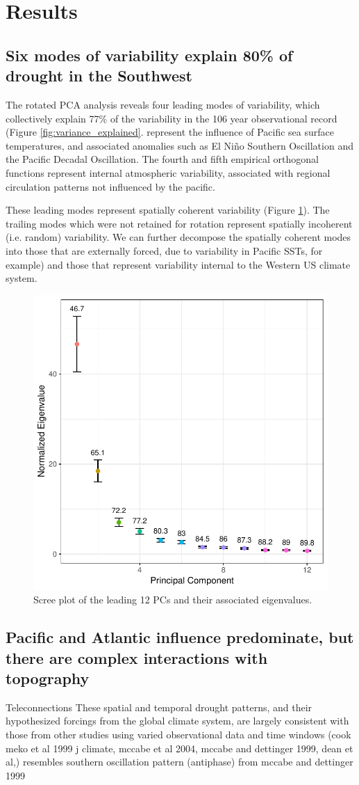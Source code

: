 \documentclass[fleqn,10pt]{wlscirep}
\begin{document}
\section*{Results}

\subsection*{Six modes of variability explain 80\% of drought in the Southwest}

The rotated PCA analysis reveals four leading modes of variability, which collectively explain 77\% of the variability in the 106 year observational record (Figure \ref{fig:variance_explained}. represent the influence of Pacific sea surface temperatures, and associated anomalies such as El Ni\~no Southern Oscillation and the Pacific Decadal Oscillation. The fourth and fifth empirical orthogonal functions represent internal atmospheric variability, associated with regional circulation patterns not influenced by the pacific.

These leading modes represent spatially coherent variability (Figure \ref{fig:reofs}). The trailing modes which were not retained for rotation represent spatially incoherent (i.e. random) variability. We can further decompose the spatially coherent modes into those that are externally forced, due to variability in Pacific SSTs, for example) and those that represent variability internal to the Western US climate system.

\begin{figure}[ht]
\centering
\includegraphics[width=.5\linewidth]{figures/variance_explained.pdf}
\caption{Scree plot of the leading 12 PCs and their associated eigenvalues.}
\label{fig:reofs}
\end{figure}


\subsection*{Pacific and Atlantic influence predominate, but there are complex interactions with topography}
Teleconnections
These spatial and temporal drought patterns, and their hypothesized forcings from the global climate system, are largely consistent with those from other studies using varied observational data and time windows (cook meko et al 1999 j climate, mccabe et al 2004, mccabe and dettinger 1999, dean et al,)
resembles southern oscillation pattern (antiphase) from mccabe and dettinger 1999
\end{document}
